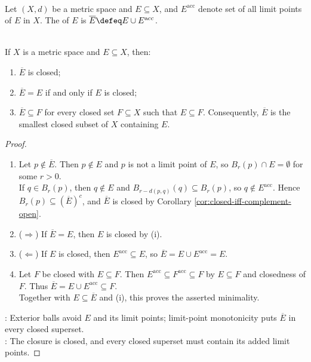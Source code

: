 \begin{definition} \label{def:metric-closure} \\
Let $(X,d)$ be a metric space and $E\subseteq X$, and $E^{\operatorname{acc}}$ denote set of all limit points of $E$ in $X$. The  of $E$ is $\overline{E}\defeq E\cup E^{\operatorname{acc}}$.
\end{definition}

\begin{theorem} \label{thm:closure-smallest-closed-containing-set} \\
If $X$ is a metric space and $E\subseteq X$, then:
\begin{enumerate}[label=(\roman*)]
\setlength{\itemsep}{0pt}
\item $\overline{E}$ is closed;
\item $\overline{E}=E$ if and only if $E$ is closed;
\item $\overline{E}\subseteq F$ for every closed set $F\subseteq X$ such that $E\subseteq F$. Consequently, $\overline{E}$ is the smallest closed subset of $X$ containing $E$.
\end{enumerate}
\begin{proof}
\begin{enumerate}[label=(\roman*)]
\setlength{\itemsep}{0pt}
\item[$(i)$] Let $p\notin\overline{E}$. Then $p\notin E$ and $p$ is not a limit point of $E$, so $B_r(p)\cap E=\emptyset$ for some $r>0$.\\
If $q\in B_r(p)$, then $q\notin E$ and $B_{r-d(p,q)}(q)\subseteq B_r(p)$, so $q\notin E^{\operatorname{acc}}$. Hence $B_r(p)\subseteq(\overline{E})^c$, and $\overline{E}$ is closed by Corollary \ref{cor:closed-iff-complement-open}.
\item[$(ii)$] ($\Rightarrow$) If $\overline{E}=E$, then $E$ is closed by (i).
\item[$(ii)$] ($\Leftarrow$) If $E$ is closed, then $E^{\operatorname{acc}}\subseteq E$, so $\overline{E}=E\cup E^{\operatorname{acc}}=E$.
\item[$(iii)$] Let $F$ be closed with $E\subseteq F$. Then $E^{\operatorname{acc}}\subseteq F^{\operatorname{acc}}\subseteq F$ by $E\subseteq F$ and closedness of $F$. Thus $\overline{E}=E\cup E^{\operatorname{acc}}\subseteq F$.\\
Together with $E\subseteq\overline{E}$ and (i), this proves the asserted minimality.
\end{enumerate}
: Exterior balls avoid $E$ and its limit points; limit-point monotonicity puts $\overline{E}$ in every closed superset.\\
: The closure is closed, and every closed superset must contain its added limit points.
\end{proof}
\end{theorem}


